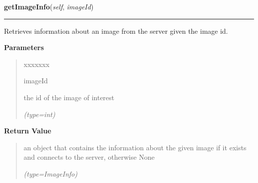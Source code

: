 \hspace{.8\funcindent}\begin{boxedminipage}{\funcwidth}

    \raggedright \textbf{getImageInfo}(\textit{self}, \textit{imageId})

    \vspace{-1.5ex}

    \rule{\textwidth}{0.5\fboxrule}
\setlength{\parskip}{2ex}
    Retrieves information about an image from the server given the image 
    id.

\setlength{\parskip}{1ex}
      \textbf{Parameters}
      \vspace{-1ex}

      \begin{quote}
        \begin{Ventry}{xxxxxxx}

          \item[imageId]

          the id of the image of interest

            {\it (type=int)}

        \end{Ventry}

      \end{quote}

      \textbf{Return Value}
    \vspace{-1ex}

      \begin{quote}
      an object that contains the information about the given image if it 
      exists and connects to the server, otherwise None

      {\it (type=ImageInfo)}

      \end{quote}

    \end{boxedminipage}

    \label{client_rest:ImagingInterface:getCroppedImage}

    \vspace{0.5ex}

